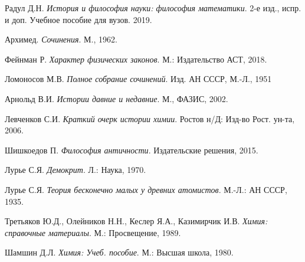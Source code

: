 \begin{thebibliography}{9}

Радул Д.Н. 
\textit{История и философия науки: философия математики}. 2-е изд., испр. и доп. Учебное пособие для вузов. 2019.

Архимед.
\textit{Сочинения}. М., 1962.

Фейнман Р.
\textit{Характер физических законов}. М.: Издательство АСТ, 2018.

Ломоносов М.В.
\textit{Полное собрание сочинений}. Изд. АН СССР, М.-Л., 1951

Арнольд В.И.
\textit{Истории давние и недавние}. М., ФАЗИС, 2002.

Левченков С.И.
\textit{Краткий очерк истории химии}. Ростов н/Д: Изд-во Рост. ун-та, 2006.

Шишкоедов П.
\textit{Философия античности}. Издательские решения, 2015.

Лурье С.Я.
\textit{Демокрит}. Л.: Наука, 1970.

Лурье С.Я.
\textit{Теория бесконечно малых у древних атомистов}.  М.-Л.: АН СССР, 1935.

Третьяков Ю.Д., Олейников Н.Н., Кеслер Я.А., Казимирчик И.В.
\textit{Химия: справочные материалы}. М.: Просвещение, 1989.

Шамшин Д.Л.
\textit{Химия: Учеб. пособие}. М.: Высшая школа, 1980.

\end{thebibliography}
